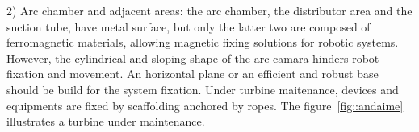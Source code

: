 




2) Arc chamber and adjacent areas: the arc chamber, the distributor area and
the suction tube, have metal surface, but only the latter two are composed
of ferromagnetic materials, allowing magnetic fixing solutions for robotic
systems. However, the cylindrical and sloping shape of the arc camara hinders
robot fixation and movement. An horizontal plane or an efficient and robust base should be build for the system fixation.
Under turbine maitenance, devices and equipments are fixed by scaffolding
anchored by ropes. The figure~\ref{fig::andaime} illustrates a turbine under
maintenance.

